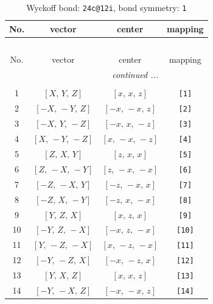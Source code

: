 \documentclass[fleqn,8pt]{jsarticle}
\begin{document}
\begin{longtable}{cccc}
\caption{Wyckoff bond: {\tt 24c@12i}, bond symmetry: {\tt 1}}
 \\
 \hline \hline
No. & vector & center & mapping \\ \hline \endfirsthead

\multicolumn{3}{l}{\tablename\ \thetable{}} \\
 \hline \hline
No. & vector & center & mapping \\ \hline \endhead

 \hline \hline
\multicolumn{3}{r}{\footnotesize\it continued ...} \\ \endfoot

 \hline \hline
\multicolumn{3}{r}{} \\ \endlastfoot

1 & $\left[ X,\, Y,\, Z \right]$ & $\left[ x,\, x,\, z \right]$ & {\tt [1]} \\ \hline
2 & $\left[ - X,\, - Y,\, Z \right]$ & $\left[ - x,\, - x,\, z \right]$ & {\tt [2]} \\ \hline
3 & $\left[ - X,\, Y,\, - Z \right]$ & $\left[ - x,\, x,\, - z \right]$ & {\tt [3]} \\ \hline
4 & $\left[ X,\, - Y,\, - Z \right]$ & $\left[ x,\, - x,\, - z \right]$ & {\tt [4]} \\ \hline
5 & $\left[ Z,\, X,\, Y \right]$ & $\left[ z,\, x,\, x \right]$ & {\tt [5]} \\ \hline
6 & $\left[ Z,\, - X,\, - Y \right]$ & $\left[ z,\, - x,\, - x \right]$ & {\tt [6]} \\ \hline
7 & $\left[ - Z,\, - X,\, Y \right]$ & $\left[ - z,\, - x,\, x \right]$ & {\tt [7]} \\ \hline
8 & $\left[ - Z,\, X,\, - Y \right]$ & $\left[ - z,\, x,\, - x \right]$ & {\tt [8]} \\ \hline
9 & $\left[ Y,\, Z,\, X \right]$ & $\left[ x,\, z,\, x \right]$ & {\tt [9]} \\ \hline
10 & $\left[ - Y,\, Z,\, - X \right]$ & $\left[ - x,\, z,\, - x \right]$ & {\tt [10]} \\ \hline
11 & $\left[ Y,\, - Z,\, - X \right]$ & $\left[ x,\, - z,\, - x \right]$ & {\tt [11]} \\ \hline
12 & $\left[ - Y,\, - Z,\, X \right]$ & $\left[ - x,\, - z,\, x \right]$ & {\tt [12]} \\ \hline
13 & $\left[ Y,\, X,\, Z \right]$ & $\left[ x,\, x,\, z \right]$ & {\tt [13]} \\ \hline
14 & $\left[ - Y,\, - X,\, Z \right]$ & $\left[ - x,\, - x,\, z \right]$ & {\tt [14]} \\ \hline

\end{longtable}
\end{document}
